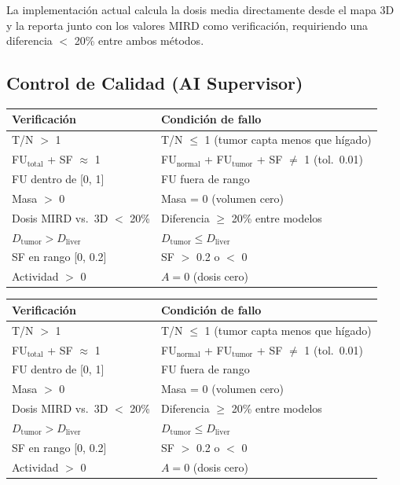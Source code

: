 \documentclass[12pt,a4paper]{article}
\begin{document}
La implementación actual calcula la dosis media directamente desde el mapa 3D y la reporta junto con los valores MIRD como verificación, requiriendo una diferencia $<$ 20\% entre ambos métodos.


\begin{tcolorbox}[aiSupervisor]
\subsection*{Control de Calidad (AI Supervisor)}

\begin{tabular}{p{5cm} p{10cm}}
\toprule
\textbf{Verificación} & \textbf{Condición de fallo} \\
\midrule
T/N $>$ 1 & T/N $\leq$ 1 (tumor capta menos que hígado) \\
FU$_{\text{total}}$ + SF $\approx$ 1 & FU$_{\text{normal}}$ + FU$_{\text{tumor}}$ + SF $\neq$ 1 (tol.\ 0.01) \\
FU dentro de [0, 1] & FU fuera de rango \\
Masa $>$ 0 & Masa = 0 (volumen cero) \\
Dosis MIRD vs.\ 3D $<$ 20\% & Diferencia $\geq$ 20\% entre modelos \\
$D_{\text{tumor}} > D_{\text{liver}}$ & $D_{\text{tumor}} \leq D_{\text{liver}}$ \\
SF en rango [0, 0.2] & SF $>$ 0.2 o $<$ 0 \\
Actividad $>$ 0 & $A = 0$ (dosis cero) \\
\bottomrule
\end{tabular}

\newpage




\begin{tabular}{p{5cm} p{10cm}}
\toprule
\textbf{Verificación} & \textbf{Condición de fallo} \\
\midrule
T/N $>$ 1 & T/N $\leq$ 1 (tumor capta menos que hígado) \\
FU$_{\text{total}}$ + SF $\approx$ 1 & FU$_{\text{normal}}$ + FU$_{\text{tumor}}$ + SF $\neq$ 1 (tol.\ 0.01) \\
FU dentro de [0, 1] & FU fuera de rango \\
Masa $>$ 0 & Masa = 0 (volumen cero) \\
Dosis MIRD vs.\ 3D $<$ 20\% & Diferencia $\geq$ 20\% entre modelos \\
$D_{\text{tumor}} > D_{\text{liver}}$ & $D_{\text{tumor}} \leq D_{\text{liver}}$ \\
SF en rango [0, 0.2] & SF $>$ 0.2 o $<$ 0 \\
Actividad $>$ 0 & $A = 0$ (dosis cero) \\
\bottomrule
\end{tabular}


\end{tcolorbox}
\end{document}
